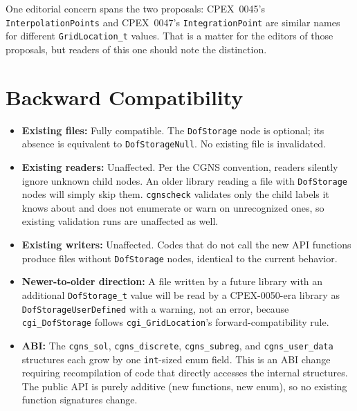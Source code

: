 \documentclass[11pt,letterpaper]{article}
\begin{document}
One editorial concern spans the two proposals: CPEX~0045's
\texttt{InterpolationPoints} and CPEX~0047's \texttt{IntegrationPoint}
are similar names for different \texttt{GridLocation\_t} values.  That
is a matter for the editors of those proposals, but readers of this one
should note the distinction.

\section{Backward Compatibility}
\label{sec:compat}

\begin{itemize}[leftmargin=2em]
\item \textbf{Existing files:} Fully compatible.  The
  \texttt{DofStorage} node is optional; its absence is
  equivalent to \texttt{DofStorageNull}.  No existing file
  is invalidated.

\item \textbf{Existing readers:} Unaffected.  Per the CGNS convention,
  readers silently ignore unknown child nodes.  An older library
  reading a file with \texttt{DofStorage} nodes will
  simply skip them.  \texttt{cgnscheck} validates only the child
  labels it knows about and does not enumerate or warn on unrecognized
  ones, so existing validation runs are unaffected as well.

\item \textbf{Existing writers:} Unaffected.  Codes that do not call
  the new API functions produce files without
  \texttt{DofStorage} nodes, identical to the current
  behavior.

\item \textbf{Newer-to-older direction:} A file written by a future
  library with an additional \texttt{DofStorage\_t} value will be read
  by a CPEX-0050-era library as \texttt{DofStorageUserDefined} with a
  warning, not an error, because \texttt{cgi\_DofStorage} follows
  \texttt{cgi\_GridLocation}'s forward-compatibility rule.

\item \textbf{ABI:} The \texttt{cgns\_sol}, \texttt{cgns\_discrete},
  \texttt{cgns\_subreg}, and \texttt{cgns\_user\_data} structures each
  grow by one \texttt{int}-sized enum field.
  This is an ABI change requiring recompilation of code that directly
  accesses the internal structures.  The public API is purely additive
  (new functions, new enum), so no existing function signatures change.
\end{itemize}
\end{document}
